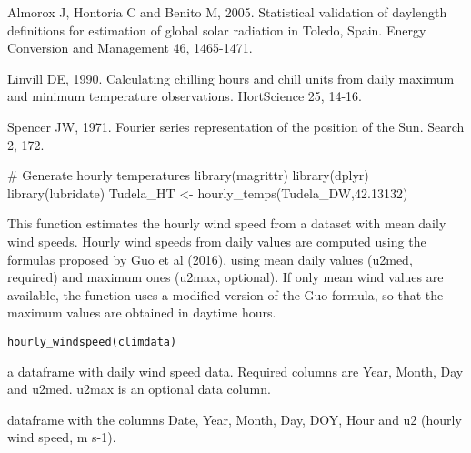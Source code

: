 \documentclass[a4paper]{book}
\begin{document}
%
\begin{References}\relax
Almorox J, Hontoria C and Benito M, 2005. Statistical validation of
daylength definitions for estimation of global solar radiation in Toledo,
Spain. Energy Conversion and Management 46, 1465-1471.

Linvill DE, 1990. Calculating chilling hours and chill units from daily
maximum and minimum temperature observations. HortScience 25, 14-16.

Spencer JW, 1971. Fourier series representation of the position of the Sun.
Search 2, 172.
\end{References}
%
\begin{Examples}
\begin{ExampleCode}

# Generate hourly temperatures
library(magrittr)
library(dplyr)
library(lubridate)
Tudela_HT <- hourly_temps(Tudela_DW,42.13132)

\end{ExampleCode}
\end{Examples}
%
\begin{Description}\relax
This function estimates the hourly wind speed from a
dataset with mean daily wind speeds. Hourly wind speeds
from daily values are computed using the formulas proposed
by Guo et al (2016), using mean daily values (u2med, required)
and maximum ones (u2max, optional). If only mean wind values
are available, the function uses a modified version of the 
Guo formula, so that the maximum values are obtained in 
daytime hours.
\end{Description}
%
\begin{Usage}
\begin{verbatim}
hourly_windspeed(climdata)
\end{verbatim}
\end{Usage}
%
\begin{Arguments}
\begin{ldescription}
\item[\code{climdata}] a dataframe with daily wind speed data.
Required columns are Year, Month, Day and u2med. u2max
is an optional data column.
\end{ldescription}
\end{Arguments}
%
\begin{Value}
dataframe with the columns Date, Year, Month, Day, DOY,
Hour and u2 (hourly wind speed, m s-1).
\end{Value}
\end{document}
